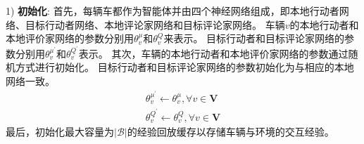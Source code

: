 1) \textbf{初始化}: 首先，每辆车都作为智能体并由四个神经网络组成，即本地行动者网络、目标行动者网络、本地评论家网络和目标评论家网络。
车辆$v$的本地行动者和本地评价家网络的参数分别用$\theta_{v}^{\mu}$和$\theta_{v}^{Q}$来表示。
目标行动者和目标评论家网络的参数分别用$\theta_{v}^{\mu^{\prime}}$和$\theta_{v}^{Q^{\prime}}$表示。
其次，车辆的本地行动者和本地评价家网络的参数通过随机方式进行初始化。
目标行动者和目标评论家网络的参数初始化为与相应的本地网络一致。
\begin{align}
	\theta_{v}^{\mu^{\prime}} \leftarrow \theta_{v}^{\mu}, \forall v \in \mathbf{V}\\
	\theta_{v}^{Q^{\prime}} \leftarrow \theta_{v}^{Q}, \forall v \in \mathbf{V}
\end{align}
最后，初始化最大容量为$|\mathcal{B}|$的经验回放缓存以存储车辆与环境的交互经验。



